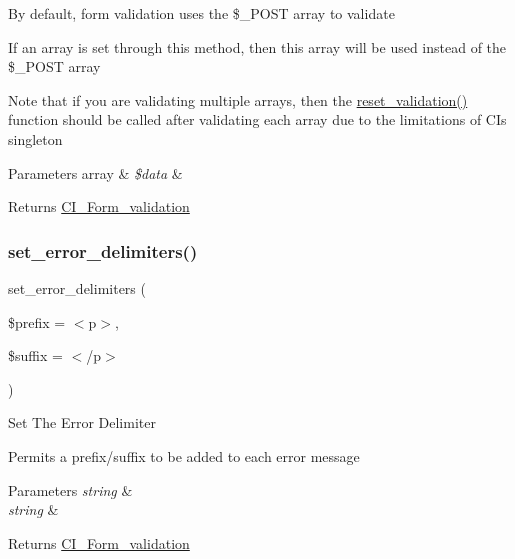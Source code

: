 By default, form validation uses the \$\+\_\+\+P\+O\+ST array to validate

If an array is set through this method, then this array will be used instead of the \$\+\_\+\+P\+O\+ST array

Note that if you are validating multiple arrays, then the \mbox{\hyperlink{class_c_i___form__validation_a84b8bd64032f6be532968015cba11361}{reset\+\_\+validation()}} function should be called after validating each array due to the limitations of CI\textquotesingle{}s singleton


\begin{DoxyParams}[1]{Parameters}
array & {\em \$data} & \\
\hline
\end{DoxyParams}
\begin{DoxyReturn}{Returns}
\mbox{\hyperlink{class_c_i___form__validation}{C\+I\+\_\+\+Form\+\_\+validation}} 
\end{DoxyReturn}
\mbox{\label{class_c_i___form__validation_ac45ddc321a1c1e5d5aad6e11f1f29b9c}} 
\subsubsection{\texorpdfstring{set\+\_\+error\+\_\+delimiters()}{set\_error\_delimiters()}}
{\footnotesize\ttfamily set\+\_\+error\+\_\+delimiters (\begin{DoxyParamCaption}\item[{}]{\$prefix = {\ttfamily \textquotesingle{}$<$p$>$\textquotesingle{}},  }\item[{}]{\$suffix = {\ttfamily \textquotesingle{}$<$/p$>$\textquotesingle{}} }\end{DoxyParamCaption})}

Set The Error Delimiter

Permits a prefix/suffix to be added to each error message


\begin{DoxyParams}{Parameters}
{\em string} & \\
\hline
{\em string} & \\
\hline
\end{DoxyParams}
\begin{DoxyReturn}{Returns}
\mbox{\hyperlink{class_c_i___form__validation}{C\+I\+\_\+\+Form\+\_\+validation}} 
\end{DoxyReturn}
\mbox{\label{class_c_i___form__validation_a5a0dc4d3aef1f228155320a1d5275895}} 
